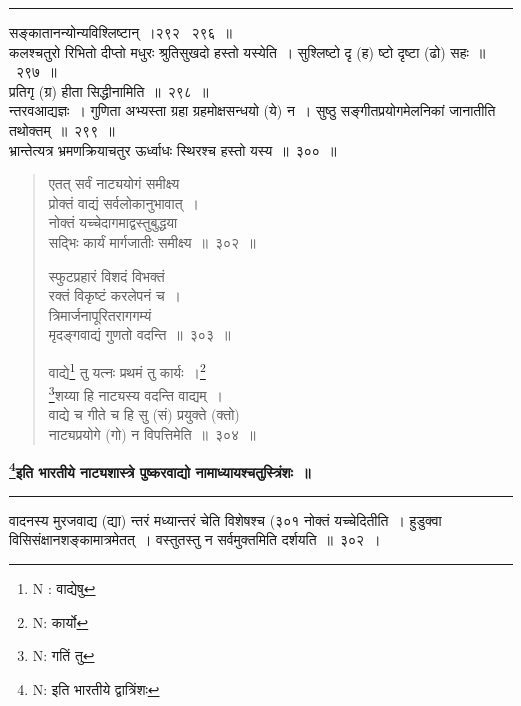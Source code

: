 \documentclass[11pt, openany]{book}
\begin{document}
\hrule
 
\vspace{2mm}
सङ्कातानन्योन्यविश्लिष्टान्~।२९२ \textendash\ २९६~॥\\

कलश्चतुरो रिभितो दीप्तो मधुरः श्रुतिसुखदो हस्तो यस्येति~। सुश्लिष्टो दृ (ह) ष्टो दृष्टा (ढो) सहः~॥~२९७~॥\\

प्रतिगृ (ग्र) हीता सिद्धीनामिति~॥~२९८~॥\\

{\qtt न्तरवआद्यज्ञः}~। गुणिता अभ्यस्ता ग्रहा ग्रहमोक्षसन्धयो (ये) न~। सुष्ठु सङ्गीतप्रयोगमेलनिकां जानातीति तथोक्तम्~॥~२९९~॥\\

भ्रान्तेत्यत्र भ्रमणक्रियाचतुर ऊर्ध्वाधः स्थिरश्च हस्तो यस्य~॥~३००~॥

\newpage

\begin{quote}
{\na  एतत् सर्वं नाट्ययोगं समीक्ष्य\\
 प्रोक्तं वाद्यं सर्वलोकानुभावात्~।\\
 नोक्तं यच्चेदागमाद्वस्तुबुद्धया\\
 सद्भिः कार्यं मार्गजातीः समीक्ष्य~॥~३०२~॥

 स्फुटप्रहारं विशदं विभक्तं\\
 रक्तं विकृष्टं करलेपनं च~।\\
 त्रिमार्जनापूरितरागगम्यं\\
 मृदङ्गवाद्यं गुणतो वदन्ति~॥~३०३~॥

 वाद्ये\renewcommand{\thefootnote}{1}\footnote{N : वाद्येषु} तु यत्नः प्रथमं तु कार्यः~।\renewcommand{\thefootnote}{2}\footnote{N: कार्यो}\\
 \renewcommand{\thefootnote}{3}\footnote{N: गतिं तु}शय्या हि नाट्यस्य वदन्ति वाद्यम्~।\\
 वाद्ये च गीते च हि सु (सं) प्रयुक्ते (क्तो)\\
 नाट्यप्रयोगे (गो) न विपत्तिमेति~॥~३०४~॥}
\end{quote}

\begin{center}
\textbf{ \renewcommand{\thefootnote}{4}\footnote{N: इति भारतीये द्वात्रिंशः}इति भारतीये नाट्यशास्त्रे पुष्करवाद्यो नामाध्यायश्चतुस्त्रिंशः~॥}
\end{center}

\hrule

\vspace{2mm}
वादनस्य मुरजवाद्य (द्या) न्तरं मध्यान्तरं चेति विशेषश्च (३०१ नोक्तं यच्चेदितीति~। हुडुक्वा विसिसंक्षानशङ्कामात्रमेतत्~। वस्तुतस्तु न सर्वमुक्तमिति दर्शयति~॥~३०२~।\\
\end{document}
